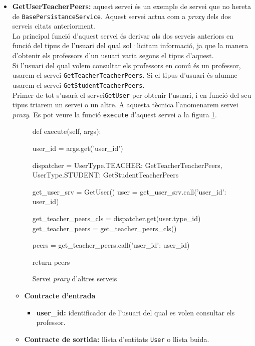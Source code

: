 \begin{itemize}
			\item \textbf{GetUserTeacherPeers:} aquest servei és un exemple de servei que no hereta de \texttt{BasePersistanceService}. Aquest servei actua com a \emph{proxy} dels dos serveis citats anteriorment.\\
			
			 La principal funció d'aquest servei és derivar als dos serveis anteriors en funció del tipus de l'usuari del qual sol·licitam informació,  ja que la manera d'obtenir els professors d'un usuari varia segons el tipus d'aquest. \\
			 
			 Si l'usuari del qual volem consultar els professors en comú és un professor, usarem el servei \texttt{GetTeacherTeacherPeers}. Si el tipus d'usuari és alumne usarem el servei \texttt{GetStudentTeacherPeers}.\\
			 
			  Primer de tot s'usarà el servei\texttt{GetUser} per obtenir l'usuari, i en funció del seu tipus triarem un servei o un altre. A aquesta tècnica l'anomenarem servei \emph{proxy}. Es pot veure la funció \texttt{execute} d'aquest servei a la figura \ref{fig:proxy_srv}.
			
			\begin{figure}[h!]
				\begin{python}
def execute(self, args):
	
	user_id = args.get('user_id')
	
	dispatcher = {
		UserType.TEACHER: GetTeacherTeacherPeers,
		UserType.STUDENT: GetStudentTeacherPeers
	}
	
	get_user_srv = GetUser()
	user = get_user_srv.call({'user_id': user_id})
	
	get_teacher_peers_cls = dispatcher.get(user.type_id)
	get_teacher_peers = get_teacher_peers_cls()
	
	peers = get_teacher_peers.call({'user_id': user_id})
	
	return peers
				\end{python}
				\label{fig:proxy_srv}
				\caption{Servei \emph{proxy} d'altres serveis}
			\end{figure}
			
			\begin{itemize}
					\item \textbf{Contracte d'entrada}
						\begin{itemize}
							\item \textbf{user\_id:} identificador de l'usuari del qual es volen consultar els professor.
						\end{itemize}
					\item \textbf{Contracte de sortida:} llista d'entitats \texttt{User} o llista buida.
				\end{itemize}
				

\end{itemize}
